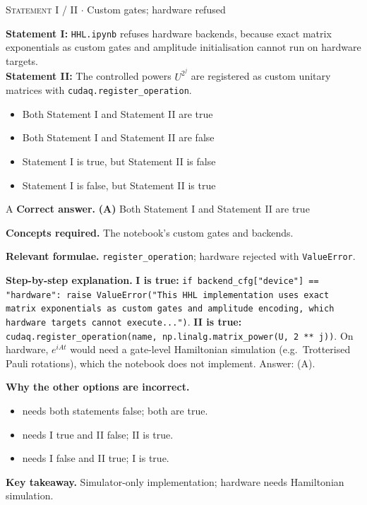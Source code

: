 \documentclass[11pt,a4paper]{article}
\newcommand{\optlabel}[1]{\textbf{(#1)}}
\newcommand{\correctlabel}[1]{\textcolor{okgreen}{\textbf{(#1)}\,\ding{51}}}
\newenvironment{qitem}[1]{\begin{list}{}{\setlength{\leftmargin}{3.3em}\setlength{\labelwidth}{3.1em}%
  \setlength{\labelsep}{0.2em}\setlength{\topsep}{3pt}\setlength{\parsep}{3pt}}\item[\textbf{Q.#1}\hfill]}{\end{list}}
\newcommand{\qsep}{\par\vspace{2pt}{\color{black!15}\hrule}\vspace{4pt}}
\newcommand{\qmeta}[2]{{\footnotesize\color{black!60}\textsc{#1} \;$\cdot$\; #2}\par}
\begin{document}
\begin{qitem}{74}
\qmeta{Statement I / II}{Custom gates; hardware refused}
\textbf{Statement I:} \texttt{HHL.ipynb} refuses hardware backends, because exact matrix exponentials as custom gates and amplitude initialisation cannot run on hardware targets.\\[1mm]
\textbf{Statement II:} The controlled powers $U^{2^j}$ are registered as custom unitary matrices with \texttt{cudaq.register\_operation}.
\begin{itemize}[leftmargin=2.6em, labelsep=0.4em, itemsep=2pt, topsep=3pt]
\item[\correctlabel{A}] Both Statement I and Statement II are true
\item[\optlabel{B}] Both Statement I and Statement II are false
\item[\optlabel{C}] Statement I is true, but Statement II is false
\item[\optlabel{D}] Statement I is false, but Statement II is true
\end{itemize}
\end{qitem}
\begin{solbox}{A}
\textbf{\color{brand}Correct answer.} \textcolor{okgreen}{\textbf{(A)}} Both Statement I and Statement II are true

\textbf{\color{brand}Concepts required.} The notebook's custom gates and backends.

\textbf{\color{brand}Relevant formulae.} \texttt{register\_operation}; hardware rejected with \texttt{ValueError}.

\textbf{\color{brand}Step-by-step explanation.} \textbf{I is true:} \texttt{if backend\_cfg["device"] == "hardware": raise ValueError("This HHL implementation uses exact matrix exponentials as custom gates and amplitude encoding,
which hardware targets cannot execute...")}.
\textbf{II is true:} \texttt{cudaq.register\_operation(name, np.linalg.matrix\_power(U, 2 ** j))}. On hardware, $e^{iAt}$ would need a gate-level Hamiltonian simulation (e.g.\ Trotterised Pauli
rotations), which the notebook does not implement. Answer: (A).

\textbf{\color{brand}Why the other options are incorrect.}
\begin{itemize}[leftmargin=2.4em, itemsep=1pt, topsep=2pt]
\item[\textbf{(B)}] needs both statements false; both are true.
\item[\textbf{(C)}] needs I true and II false; II is true.
\item[\textbf{(D)}] needs I false and II true; I is true.
\end{itemize}
\textbf{\color{brand}Key takeaway.} Simulator-only implementation; hardware needs Hamiltonian simulation.
\end{solbox}
\qsep
\end{document}
